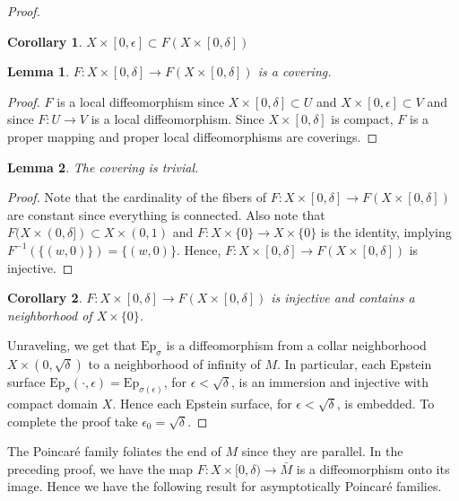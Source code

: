 \documentclass{amsart}
\newtheorem*{lem*}{Lemma}
\newtheorem*{cor*}{Corollary}
\begin{document}
\begin{proof}
\begin{cor*}
$X \times [0,\epsilon] \subset F(X \times [0,\delta])$
\end{cor*}

\begin{lem*}
$F: X \times [0,\delta] \to F(X \times [0,\delta])$ is a covering. 
\end{lem*}

\begin{proof}
$F$ is a local diffeomorphism since $X \times [0,\delta] \subset U$ and $X \times [0,\epsilon] \subset V$ and since $F: U \to V$ is a local diffeomorphism. 
Since $X \times [0,\delta]$ is compact, $F$ is a proper mapping and proper local diffeomorphisms are coverings. 
\end{proof}

\begin{lem*}
The covering is trivial. 
\end{lem*}

\begin{proof}
Note that the cardinality of the fibers of $F: X \times [0,\delta] \to F(X \times [0,\delta])$ are constant since everything is connected. 
Also note that $F( X \times (0,\delta]) \subset X \times (0,1)$ and $F: X \times \{0\} \to X \times \{0\}$ is the identity, implying $F^{-1}(\{(w,0)\}) = \{(w,0)\}$. 
Hence, $F: X \times [0,\delta] \to F(X \times [0,\delta])$ is injective. 
\end{proof}

\begin{cor*}
$F: X \times [0,\delta] \to F(X \times [0,\delta])$ is injective and contains a neighborhood of $X \times \{0\}$.
\end{cor*}



Unraveling, we get that $\mathrm{Ep}_{\sigma}$ is a diffeomorphism from a collar neighborhood $X \times (0,\sqrt{\delta})$ to a neighborhood of infinity of $M$.
In particular, each Epstein surface $\mathrm{Ep}_\sigma(\cdot, \epsilon) = \mathrm{Ep}_{\sigma(\epsilon)}$, for $\epsilon < \sqrt{\delta}$, is an immersion and injective with compact domain $X$. 
Hence each Epstein surface, for $\epsilon < \sqrt{\delta}$, is embedded.
To complete the proof take $\epsilon_0 = \sqrt{\delta}$.

\end{proof}


The Poincar\'e family foliates the end of $M$ since they are parallel. 
In the preceding proof, we have the map $F: X \times [0,\delta) \to \bar{M}$ is a diffeomorphism onto its image. 
Hence we have the following result for asymptotically Poincar\'e families.
\end{document}
